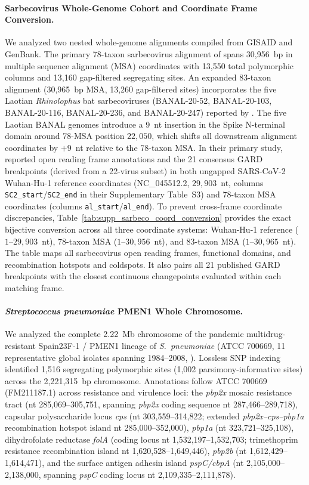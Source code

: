 \paragraph{Sarbecovirus Whole-Genome Cohort and Coordinate Frame Conversion.}
We analyzed two nested whole-genome alignments compiled from GISAID and GenBank.
The primary 78-taxon sarbecovirus alignment of \citet{lytras2022exploring} spans 30,956~bp in multiple sequence alignment (MSA) coordinates with 13,550 total polymorphic columns and 13,160 gap-filtered segregating sites.
An expanded 83-taxon alignment (30,965~bp MSA, 13,260 gap-filtered sites) incorporates the five Laotian \textit{Rhinolophus} bat sarbecoviruses (BANAL-20-52, BANAL-20-103, BANAL-20-116, BANAL-20-236, and BANAL-20-247) reported by \citet{temmam2022bat}.
The five Laotian BANAL genomes introduce a 9~nt insertion in the Spike N-terminal domain around 78-MSA position $22{,}050$, which shifts all downstream alignment coordinates by $+9$~nt relative to the 78-taxon MSA.
In their primary study, \citet{lytras2022exploring} reported open reading frame annotations and the 21 consensus GARD breakpoints (derived from a 22-virus subset) in both ungapped SARS-CoV-2 Wuhan-Hu-1 reference coordinates (NC\_045512.2, $29{,}903$~nt, columns \texttt{SC2\_start}/\texttt{SC2\_end} in their Supplementary Table~S3) and 78-taxon MSA coordinates (columns \texttt{al\_start}/\texttt{al\_end}).
To prevent cross-frame coordinate discrepancies, Table~\ref{tab:supp_sarbeco_coord_conversion} provides the exact bijective conversion across all three coordinate systems: Wuhan-Hu-1 reference ($1\text{--}29{,}903$~nt), 78-taxon MSA ($1\text{--}30{,}956$~nt), and 83-taxon MSA ($1\text{--}30{,}965$~nt).
The table maps all sarbecovirus open reading frames, functional domains, and recombination hotspots and coldspots.
It also pairs all 21 published GARD breakpoints with the closest \RhizAeon continuous changepoints evaluated within each matching frame.

\paragraph{\textit{Streptococcus pneumoniae} PMEN1 Whole Chromosome.}
We analyzed the complete 2.22~Mb chromosome of the pandemic multidrug-resistant Spain23F-1 / PMEN1 lineage of \textit{S.~pneumoniae} (ATCC 700669, 11 representative global isolates spanning 1984--2008, \citealt{croucher2011rapid}).
Lossless SNP indexing identified 1,516 segregating polymorphic sites (1,002 parsimony-informative sites) across the 2,221,315~bp chromosome.
Annotations follow ATCC 700669 (FM211187.1) across resistance and virulence loci: the \textit{pbp2x} mosaic resistance tract (nt 285,069--305,751, spanning \textit{pbp2x} coding sequence nt 287,466--289,718), capsular polysaccharide locus \textit{cps} (nt 303,559--314,822; extended \textit{pbp2x--cps--pbp1a} recombination hotspot island nt 285,000--352,000), \textit{pbp1a} (nt 323,721--325,108), dihydrofolate reductase \textit{folA} (coding locus nt 1,532,197--1,532,703; trimethoprim resistance recombination island nt 1,620,528--1,649,446), \textit{pbp2b} (nt 1,612,429--1,614,471), and the surface antigen adhesin island \textit{pspC/cbpA} (nt 2,105,000--2,138,000, spanning \textit{pspC} coding locus nt 2,109,335--2,111,878).

